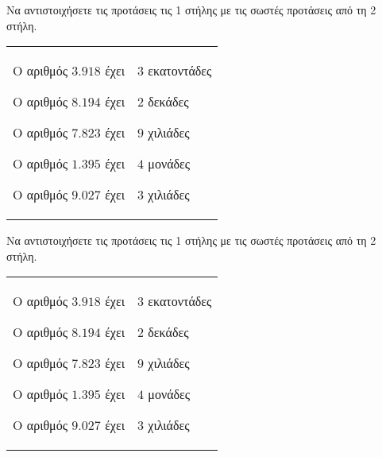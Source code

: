 Να αντιστοιχήσετε τις προτάσεις τις 1 στήλης με τις σωστές προτάσεις από τη 2  στήλη.
\vspace{-5mm}
\begin{flushleft}
\begin{tabular}{p{3.7cm}p{3.7cm}}
\begin{rlist}[leftmargin=2mm]
\item Ο αριθμός $ 3.918 $ έχει
\item Ο αριθμός $ 8.194 $ έχει
\item Ο αριθμός $ 7.823 $ έχει
\item Ο αριθμός $ 1.395 $ έχει
\item Ο αριθμός $ 9.027 $ έχει
\end{rlist} & 
\begin{rlist}
\item $ 3 $ εκατοντάδες
\item $ 2 $ δεκάδες
\item $ 9 $ χιλιάδες
\item $ 4 $ μονάδες
\item $ 3 $ χιλιάδες
\end{rlist} \\ 
\end{tabular} 
\end{flushleft}
Να αντιστοιχήσετε τις προτάσεις τις 1 στήλης με τις σωστές προτάσεις από τη 2  στήλη.
\vspace{-5mm}
\begin{flushleft}
\begin{tabular}{p{3.7cm}p{3.7cm}}
\begin{rlist}[leftmargin=2mm]
\item Ο αριθμός $ 3.918 $ έχει
\item Ο αριθμός $ 8.194 $ έχει
\item Ο αριθμός $ 7.823 $ έχει
\item Ο αριθμός $ 1.395 $ έχει
\item Ο αριθμός $ 9.027 $ έχει
\end{rlist} & 
\begin{rlist}
\item $ 3 $ εκατοντάδες
\item $ 2 $ δεκάδες
\item $ 9 $ χιλιάδες
\item $ 4 $ μονάδες
\item $ 3 $ χιλιάδες
\end{rlist} \\ 
\end{tabular} 
\end{flushleft}
